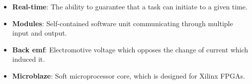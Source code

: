 \documentclass[../../main.tex]{subfiles}
\begin{document}
\begin{itemize}
    
    
    \item \textbf{Real-time}: The ability to guarantee that a task can initiate to a given time.
    \item \textbf{Modules}: Self-contained software unit communicating through multiple input and output.
    \item \textbf{Back emf}: Electromotive voltage which opposes the change of current which induced it. 
    \item \textbf{Microblaze}: Soft microprocessor core, which is designed for Xilinx FPGAs.
\end{itemize}
\end{document}

